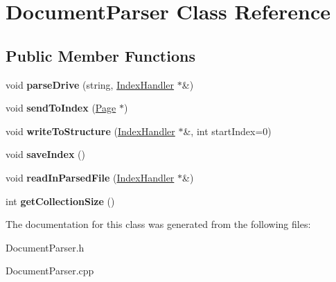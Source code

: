 \hypertarget{class_document_parser}{\section{Document\+Parser Class Reference}
\label{class_document_parser}
}
\subsection*{Public Member Functions}
\begin{DoxyCompactItemize}
\item 
\hypertarget{class_document_parser_a40fc3f32cbe2d6f4f978caa42ee509d6}{void {\bfseries parse\+Drive} (string, \hyperlink{class_index_handler}{Index\+Handler} $\ast$\&)}\label{class_document_parser_a40fc3f32cbe2d6f4f978caa42ee509d6}

\item 
\hypertarget{class_document_parser_ae132955b8118c74df2705defd1fe856b}{void {\bfseries send\+To\+Index} (\hyperlink{class_page}{Page} $\ast$)}\label{class_document_parser_ae132955b8118c74df2705defd1fe856b}

\item 
\hypertarget{class_document_parser_a7ca97302ad273efde7f33163ab9e78dc}{void {\bfseries write\+To\+Structure} (\hyperlink{class_index_handler}{Index\+Handler} $\ast$\&, int start\+Index=0)}\label{class_document_parser_a7ca97302ad273efde7f33163ab9e78dc}

\item 
\hypertarget{class_document_parser_a8f07107cbe76401f9db73dbf9cae7a5f}{void {\bfseries save\+Index} ()}\label{class_document_parser_a8f07107cbe76401f9db73dbf9cae7a5f}

\item 
\hypertarget{class_document_parser_a8046232e6026fb59d3052426e7ed7a58}{void {\bfseries read\+In\+Parsed\+File} (\hyperlink{class_index_handler}{Index\+Handler} $\ast$\&)}\label{class_document_parser_a8046232e6026fb59d3052426e7ed7a58}

\item 
\hypertarget{class_document_parser_a23dd86d1fb040662e97845d2499e5ae1}{int {\bfseries get\+Collection\+Size} ()}\label{class_document_parser_a23dd86d1fb040662e97845d2499e5ae1}

\end{DoxyCompactItemize}


The documentation for this class was generated from the following files\+:\begin{DoxyCompactItemize}
\item 
Document\+Parser.\+h\item 
Document\+Parser.\+cpp\end{DoxyCompactItemize}
